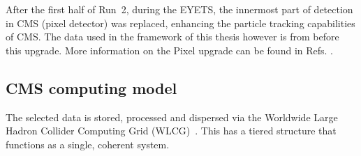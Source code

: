 After the first half of Run~2, during the EYETS, the innermost part of detection in CMS (pixel detector) was replaced, enhancing the particle tracking capabilities of CMS. The data used in the framework of this thesis however is from before this upgrade. More information on the Pixel upgrade can be found in Refs. \cite{CMS:2012sda,Perrey:1644757}.

\subsection{CMS computing model}
\label{sec:Computing}
The selected data is stored, processed and dispersed via the Worldwide Large Hadron Collider Computing Grid (WLCG)~\cite{Grandi:814248,Eck:840543}. This has a tiered structure that functions as a single, coherent system. 

